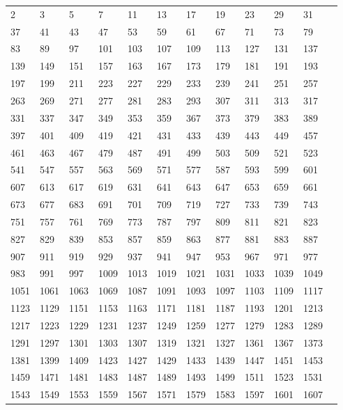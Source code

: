\begin{table}
\begin{tabular}{llllllllllll}
2 & 3 & 5 & 7 & 11 & 13 & 17 & 19 & 23 & 29 & 31 \\ 
37 & 41 & 43 & 47 & 53 & 59 & 61 & 67 & 71 & 73 & 79 \\ 
83 & 89 & 97 & 101 & 103 & 107 & 109 & 113 & 127 & 131 & 137 \\ 
139 & 149 & 151 & 157 & 163 & 167 & 173 & 179 & 181 & 191 & 193 \\ 
197 & 199 & 211 & 223 & 227 & 229 & 233 & 239 & 241 & 251 & 257 \\ 
263 & 269 & 271 & 277 & 281 & 283 & 293 & 307 & 311 & 313 & 317 \\ 
331 & 337 & 347 & 349 & 353 & 359 & 367 & 373 & 379 & 383 & 389 \\ 
397 & 401 & 409 & 419 & 421 & 431 & 433 & 439 & 443 & 449 & 457 \\ 
461 & 463 & 467 & 479 & 487 & 491 & 499 & 503 & 509 & 521 & 523 \\ 
541 & 547 & 557 & 563 & 569 & 571 & 577 & 587 & 593 & 599 & 601 \\ 
607 & 613 & 617 & 619 & 631 & 641 & 643 & 647 & 653 & 659 & 661 \\ 
673 & 677 & 683 & 691 & 701 & 709 & 719 & 727 & 733 & 739 & 743 \\ 
751 & 757 & 761 & 769 & 773 & 787 & 797 & 809 & 811 & 821 & 823 \\ 
827 & 829 & 839 & 853 & 857 & 859 & 863 & 877 & 881 & 883 & 887 \\ 
907 & 911 & 919 & 929 & 937 & 941 & 947 & 953 & 967 & 971 & 977 \\ 
983 & 991 & 997 & 1009 & 1013 & 1019 & 1021 & 1031 & 1033 & 1039 & 1049 \\ 
1051 & 1061 & 1063 & 1069 & 1087 & 1091 & 1093 & 1097 & 1103 & 1109 & 1117 \\ 
1123 & 1129 & 1151 & 1153 & 1163 & 1171 & 1181 & 1187 & 1193 & 1201 & 1213 \\ 
1217 & 1223 & 1229 & 1231 & 1237 & 1249 & 1259 & 1277 & 1279 & 1283 & 1289 \\ 
1291 & 1297 & 1301 & 1303 & 1307 & 1319 & 1321 & 1327 & 1361 & 1367 & 1373 \\ 
1381 & 1399 & 1409 & 1423 & 1427 & 1429 & 1433 & 1439 & 1447 & 1451 & 1453 \\ 
1459 & 1471 & 1481 & 1483 & 1487 & 1489 & 1493 & 1499 & 1511 & 1523 & 1531 \\ 
1543 & 1549 & 1553 & 1559 & 1567 & 1571 & 1579 & 1583 & 1597 & 1601 & 1607 \\ 

\end{tabular}
\end{table}
